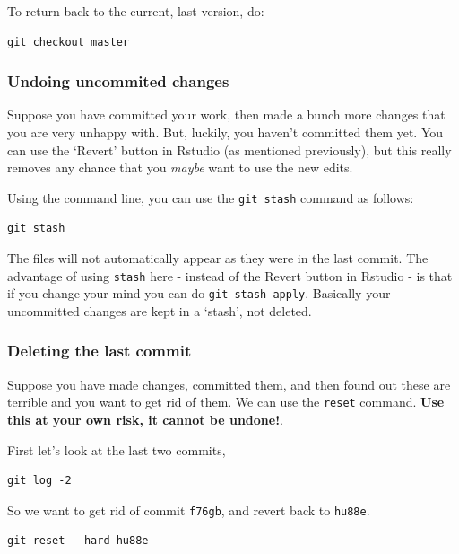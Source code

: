 \documentclass[]{book}
\begin{document}
To return back to the current, last version, do:

\begin{verbatim}
git checkout master
\end{verbatim}

\hypertarget{undoing-uncommited-changes}{%
\subsubsection{Undoing uncommited changes}\label{undoing-uncommited-changes}}

Suppose you have committed your work, then made a bunch more changes that you are very unhappy with. But, luckily, you haven't committed them yet. You can use the `Revert' button in Rstudio (as mentioned previously), but this really removes any chance that you \emph{maybe} want to use the new edits.

Using the command line, you can use the \texttt{git\ stash} command as follows:

\begin{verbatim}
git stash
\end{verbatim}

The files will not automatically appear as they were in the last commit. The advantage of using \texttt{stash} here - instead of the Revert button in Rstudio - is that if you change your mind you can do \texttt{git\ stash\ apply}. Basically your uncommitted changes are kept in a `stash', not deleted.

\hypertarget{deleting-the-last-commit}{%
\subsubsection{Deleting the last commit}\label{deleting-the-last-commit}}

Suppose you have made changes, committed them, and then found out these are terrible and you want to get rid of them. We can use the \texttt{reset} command. \textbf{Use this at your own risk, it cannot be undone!}.

First let's look at the last two commits,

\begin{verbatim}
git log -2
\end{verbatim}

So we want to get rid of commit \texttt{f76gb}, and revert back to \texttt{hu88e}.

\begin{verbatim}
git reset --hard hu88e
\end{verbatim}
\end{document}
